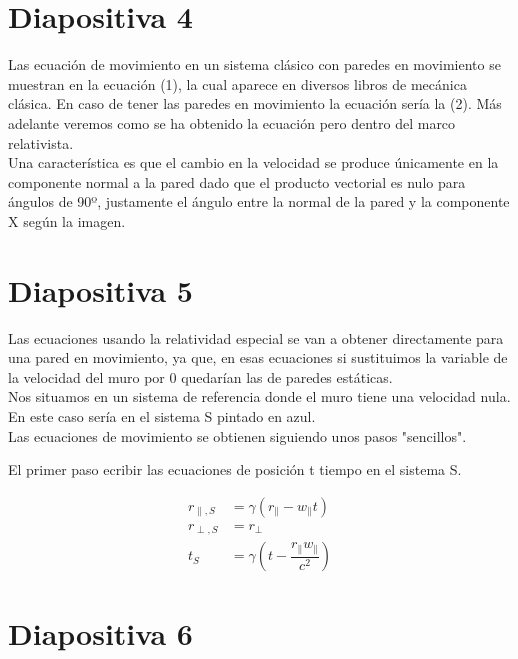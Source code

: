 \documentclass[11pt, spanish]{article}
\begin{document}

\section{Diapositiva 4}

Las ecuación de movimiento en un sistema clásico con paredes en movimiento se muestran en la ecuación (1), la cual aparece en diversos libros de mecánica clásica. En caso de tener las paredes en movimiento la ecuación sería la (2). Más adelante veremos como se ha obtenido la ecuación pero dentro del marco relativista. \\

Una característica es que el cambio en la velocidad se produce únicamente en la componente normal a la pared dado que el producto vectorial es nulo para ángulos de 90º, justamente el ángulo entre la normal de la pared y la componente X según la imagen.


\section{Diapositiva 5}

Las ecuaciones usando la relatividad especial se van a obtener directamente para una pared en movimiento, ya que, en esas ecuaciones si sustituimos la variable de la velocidad del muro por 0 quedarían las de paredes estáticas. \\

Nos situamos en un sistema de referencia donde el muro tiene una velocidad nula. En este caso sería en el sistema S pintado en azul. \\

Las ecuaciones de movimiento se obtienen siguiendo unos pasos "sencillos". 

El primer paso ecribir las ecuaciones de posición t tiempo en el sistema S.

\begin{align}\label{eq:transformacion_2d}
    r_{\parallel,S} &= \gamma\left( r_\parallel - w_\parallel t \right) \nonumber\\
    r_{\perp, S} &= r_\perp  \\
    t_S &= \gamma\left( t - \dfrac{r_\parallel w_\parallel}{c^2} \right) \nonumber
\end{align}

\section{Diapositiva 6}
\end{document}
